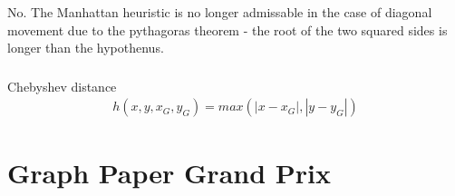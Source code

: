 \documentclass[12pt]{article}
\begin{document}
\subsubsection{}
No. The Manhattan heuristic is no longer admissable in the case of diagonal movement due to the pythagoras theorem - the root of the two squared sides is longer than the hypothenus.
\subsubsection{}
Chebyshev distance
\begin{gather*}
  h(x,y,x_G,y_G)= max(|x-x_G|, |y-y_G|)
\end{gather*}

\section{Graph Paper Grand Prix}
\end{document}
